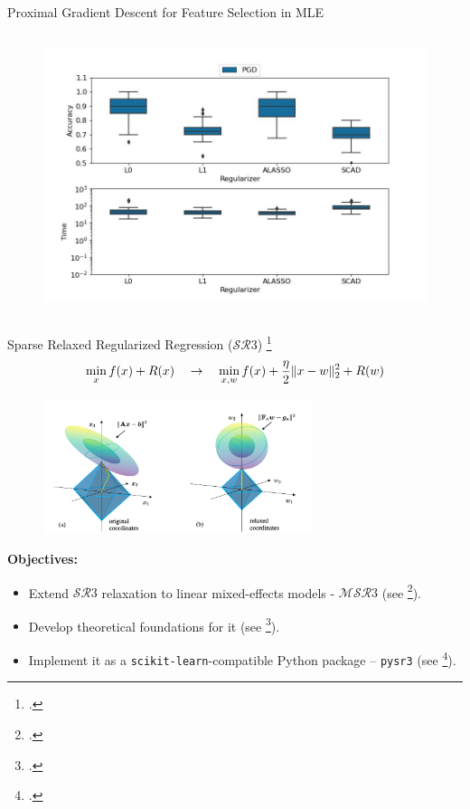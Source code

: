 \documentclass[8pt]{beamer}
\begin{document}
\begin{frame}{Proximal Gradient Descent for Feature Selection in MLE}
{\begin{columns}[T,onlytextwidth]
    	\vspace{1em}
    	\centering  
		\begin{figure}
			\includegraphics[width=\textwidth]{Figures/benchmark_pgd.jpg}
		\end{figure}
  \end{columns}
}
\end{frame}


\begin{frame}{Sparse Relaxed Regularized Regression ($\mathcal{SR}3$) \footcite{Zheng2018RelaxAndSplit}}
\begin{equation}
	\min_{x} f(x) + R(x)\quad \rightarrow \quad \min_{x, w} f(x) + \frac{\eta}{2} \|x-w\|_2^2 + R(w)
\end{equation}

\begin{figure}
	\includegraphics[width=0.7\textwidth]{Figures/intuition_prev_paper.png}
\end{figure}

\textbf{Objectives:}
\begin{itemize}
	\item Extend $\mathcal{SR}3$ relaxation to linear mixed-effects models - $\mathcal{MSR}3$ (see \footcite{sholokhov2022relaxation}).
	\item Develop theoretical foundations for it (see \footcite{aravkin2022jimtheory}).
	\item Implement it as a \texttt{scikit-learn}-compatible Python package -- \texttt{pysr3} (see \footcite{sholokhov2023pysr3}).
\end{itemize}
\vspace{1em}

\end{frame}
\end{document}
